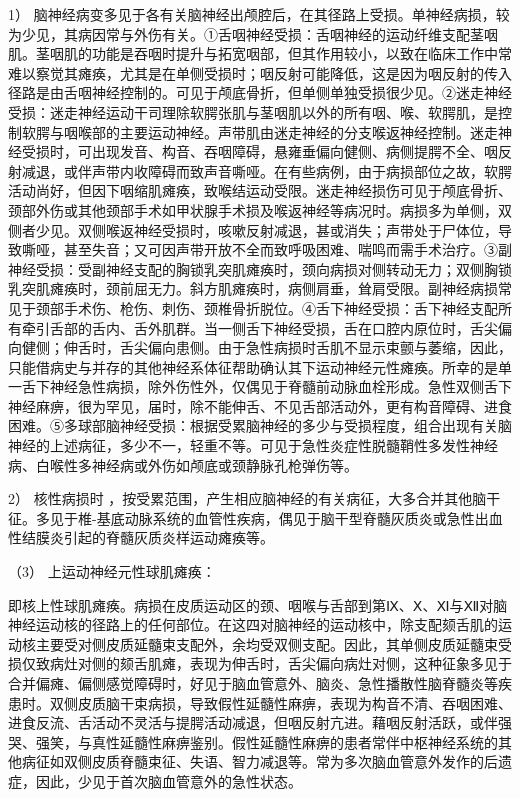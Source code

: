 1）
脑神经病变多见于各有关脑神经出颅腔后，在其径路上受损。单神经病损，较为少见，其病因常与外伤有关。①舌咽神经受损：舌咽神经的运动纤维支配茎咽肌。茎咽肌的功能是吞咽时提升与拓宽咽部，但其作用较小，以致在临床工作中常难以察觉其瘫痪，尤其是在单侧受损时；咽反射可能降低，这是因为咽反射的传入径路是由舌咽神经控制的。可见于颅底骨折，但单侧单独受损很少见。②迷走神经受损：迷走神经运动干司理除软腭张肌与茎咽肌以外的所有咽、喉、软腭肌，是控制软腭与咽喉部的主要运动神经。声带肌由迷走神经的分支喉返神经控制。迷走神经受损时，可出现发音、构音、吞咽障碍，悬雍垂偏向健侧、病侧提腭不全、咽反射减退，或伴声带内收障碍而致声音嘶哑。在有些病例，由于病损部位之故，软腭活动尚好，但因下咽缩肌瘫痪，致喉结运动受限。迷走神经损伤可见于颅底骨折、颈部外伤或其他颈部手术如甲状腺手术损及喉返神经等病况时。病损多为单侧，双侧者少见。双侧喉返神经受损时，咳嗽反射减退，甚或消失；声带处于尸体位，导致嘶哑，甚至失音；又可因声带开放不全而致呼吸困难、喘鸣而需手术治疗。③副神经受损：受副神经支配的胸锁乳突肌瘫痪时，颈向病损对侧转动无力；双侧胸锁乳突肌瘫痪时，颈前屈无力。斜方肌瘫痪时，病侧肩垂，耸肩受限。副神经病损常见于颈部手术伤、枪伤、刺伤、颈椎骨折脱位。④舌下神经受损：舌下神经支配所有牵引舌部的舌内、舌外肌群。当一侧舌下神经受损，舌在口腔内原位时，舌尖偏向健侧；伸舌时，舌尖偏向患侧。由于急性病损时舌肌不显示束颤与萎缩，因此，只能借病史与并存的其他神经系体征帮助确认其下运动神经元性瘫痪。所幸的是单一舌下神经急性病损，除外伤性外，仅偶见于脊髓前动脉血栓形成。急性双侧舌下神经麻痹，很为罕见，届时，除不能伸舌、不见舌部活动外，更有构音障碍、进食困难。⑤多球部脑神经受损：根据受累脑神经的多少与受损程度，组合出现有关脑神经的上述病征，多少不一，轻重不等。可见于急性炎症性脱髓鞘性多发性神经病、白喉性多神经病或外伤如颅底或颈静脉孔枪弹伤等。

2） 核性病损时
，按受累范围，产生相应脑神经的有关病征，大多合并其他脑干征。多见于椎-基底动脉系统的血管性疾病，偶见于脑干型脊髓灰质炎或急性出血性结膜炎引起的脊髓灰质炎样运动瘫痪等。

\hypertarget{text00018.htmlux5cux23CHP1-6-2-3-3-3}{}
（3） 上运动神经元性球肌瘫痪：

即核上性球肌瘫痪。病损在皮质运动区的颈、咽喉与舌部到第Ⅸ、Ⅹ、Ⅺ与Ⅻ对脑神经运动核的径路上的任何部位。在这四对脑神经的运动核中，除支配颏舌肌的运动核主要受对侧皮质延髓束支配外，余均受双侧支配。因此，其单侧皮质延髓束受损仅致病灶对侧的颏舌肌瘫，表现为伸舌时，舌尖偏向病灶对侧，这种征象多见于合并偏瘫、偏侧感觉障碍时，好见于脑血管意外、脑炎、急性播散性脑脊髓炎等疾患时。双侧皮质脑干束病损，导致假性延髓性麻痹，表现为构音不清、吞咽困难、进食反流、舌活动不灵活与提腭活动减退，但咽反射亢进。藉咽反射活跃，或伴强哭、强笑，与真性延髓性麻痹鉴别。假性延髓性麻痹的患者常伴中枢神经系统的其他病征如双侧皮质脊髓束征、失语、智力减退等。常为多次脑血管意外发作的后遗症，因此，少见于首次脑血管意外的急性状态。

